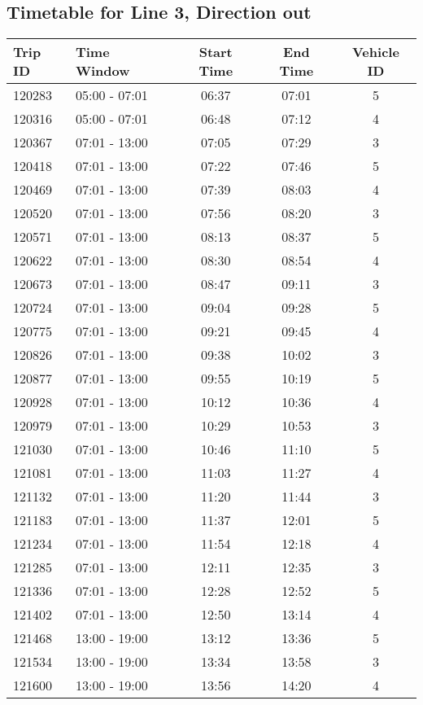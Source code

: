 \documentclass{article}
\begin{document}
\subsection*{Timetable for Line 3, Direction out}
\begin{tabular}{llccc}
\toprule
Trip ID & Time Window & Start Time & End Time & Vehicle ID \\
\midrule
120283 & 05:00 - 07:01 & 06:37 & 07:01 & 5 \\
120316 & 05:00 - 07:01 & 06:48 & 07:12 & 4 \\
120367 & 07:01 - 13:00 & 07:05 & 07:29 & 3 \\
120418 & 07:01 - 13:00 & 07:22 & 07:46 & 5 \\
120469 & 07:01 - 13:00 & 07:39 & 08:03 & 4 \\
120520 & 07:01 - 13:00 & 07:56 & 08:20 & 3 \\
120571 & 07:01 - 13:00 & 08:13 & 08:37 & 5 \\
120622 & 07:01 - 13:00 & 08:30 & 08:54 & 4 \\
120673 & 07:01 - 13:00 & 08:47 & 09:11 & 3 \\
120724 & 07:01 - 13:00 & 09:04 & 09:28 & 5 \\
120775 & 07:01 - 13:00 & 09:21 & 09:45 & 4 \\
120826 & 07:01 - 13:00 & 09:38 & 10:02 & 3 \\
120877 & 07:01 - 13:00 & 09:55 & 10:19 & 5 \\
120928 & 07:01 - 13:00 & 10:12 & 10:36 & 4 \\
120979 & 07:01 - 13:00 & 10:29 & 10:53 & 3 \\
121030 & 07:01 - 13:00 & 10:46 & 11:10 & 5 \\
121081 & 07:01 - 13:00 & 11:03 & 11:27 & 4 \\
121132 & 07:01 - 13:00 & 11:20 & 11:44 & 3 \\
121183 & 07:01 - 13:00 & 11:37 & 12:01 & 5 \\
121234 & 07:01 - 13:00 & 11:54 & 12:18 & 4 \\
121285 & 07:01 - 13:00 & 12:11 & 12:35 & 3 \\
121336 & 07:01 - 13:00 & 12:28 & 12:52 & 5 \\
121402 & 07:01 - 13:00 & 12:50 & 13:14 & 4 \\
121468 & 13:00 - 19:00 & 13:12 & 13:36 & 5 \\
121534 & 13:00 - 19:00 & 13:34 & 13:58 & 3 \\
121600 & 13:00 - 19:00 & 13:56 & 14:20 & 4 \\

\end{tabular}
\end{document}
